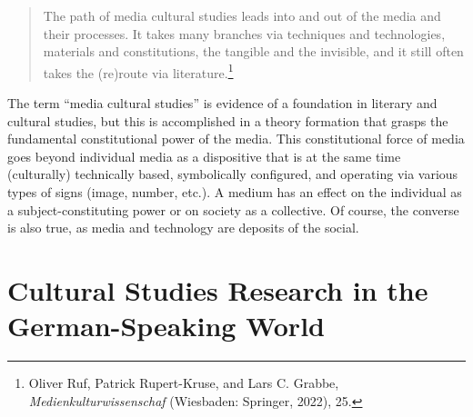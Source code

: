 \documentclass{tufte-handout}
\begin{document}
\begin{quote}
The path of media cultural studies leads into and out of the media and
their processes. It takes many branches via techniques and technologies,
materials and constitutions, the tangible and the invisible, and it
still often takes the (re)route via literature.\footnote{Oliver Ruf,
  Patrick Rupert-Kruse, and Lars C. Grabbe,
  \emph{Medienkulturwissenschaf} (Wiesbaden: Springer, 2022), 25.}
\end{quote}

\noindent The term ``media cultural studies'' is evidence of a foundation in
literary and cultural studies, but this is accomplished in a theory
formation that grasps the fundamental constitutional power of the media.
This constitutional force of media goes beyond individual media as a
dispositive that is at the same time (culturally) technically based,
symbolically configured, and operating via various types of signs
(image, number, etc.). A medium has an effect on the individual as a
subject-constituting power or on society as a collective. Of course, the
converse is also true, as media and technology are deposits of the
social.

\hypertarget{cultural-studies-research-in-the-german-speaking-world}{%
\section{Cultural Studies Research in the German-Speaking
World}\label{cultural-studies-research-in-the-german-speaking-world}}
\end{document}

